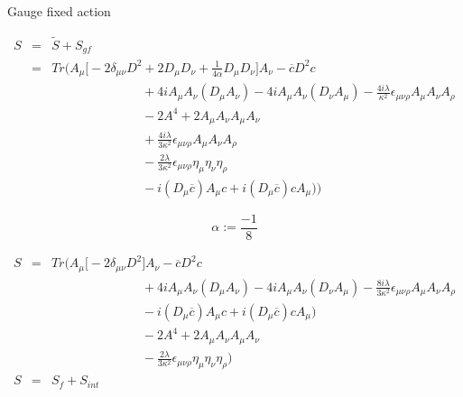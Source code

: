 \documentclass[10pt]{book}
\theoremstyle{break}
\begin{document}
Gauge fixed action

\begin{eqnarray*}
 S &=& \tilde{S} + S_{gf} \nonumber \\
 &=& Tr \Bigg( 
 A_\mu \bigg[ - 2 \delta_{\mu \nu} D^2 + 2 D_\mu D_\nu + \frac{1}{4 \alpha} D_\mu D_\nu \bigg] A_\nu - \overline{c} D^2 c \nonumber \\ 
 && \hspace{3cm} + 4i A_\mu A_\nu (D_\mu A_\nu) - 4i A_\mu A_\nu (D_\nu A_\mu) - \frac{4i\lambda}{\kappa^2} \epsilon_{\mu \nu \rho} A_\mu A_\nu A_\rho \nonumber \\
 && \hspace{3cm} - 2 A^4 + 2 A_\mu A_\nu A_\mu A_\nu \nonumber \\
 && \hspace{3cm} + \frac{4 i \lambda}{3 \kappa^2} \epsilon_{\mu \nu \rho} A_\mu A_\nu A_\rho \nonumber \\ 
 && \hspace{3cm} - \frac{2 \lambda}{3 \kappa^2} \epsilon_{\mu \nu \rho} \eta_{\mu} \eta_\nu \eta_\rho \nonumber \\
 && \hspace{3cm} - i ( D_\mu \overline{c} ) A_\mu c + i ( D_\mu \overline{c} ) c A_\mu \big) \Bigg) 
\end{eqnarray*}

\begin{equation*}
 \alpha := \frac{-1}{8}
\end{equation*}

\begin{eqnarray*}
 S &=& Tr \Bigg( 
 A_\mu \bigg[ - 2 \delta_{\mu \nu} D^2  \bigg] A_\nu - \overline{c} D^2 c \nonumber \\ 
 && \hspace{3cm} + 4i A_\mu A_\nu (D_\mu A_\nu) - 4i A_\mu A_\nu (D_\nu A_\mu) - \frac{8i\lambda}{3\kappa^2} \epsilon_{\mu \nu \rho} A_\mu A_\nu A_\rho \nonumber \\
 && \hspace{3cm} - i ( D_\mu \overline{c} ) A_\mu c + i ( D_\mu \overline{c} ) c A_\mu \big) \nonumber \\
 && \hspace{3cm} - 2 A^4 + 2 A_\mu A_\nu A_\mu A_\nu \nonumber \\ 
 && \hspace{3cm} - \frac{2 \lambda}{3 \kappa^2} \epsilon_{\mu \nu \rho} \eta_{\mu} \eta_\nu \eta_\rho \Bigg) \\
 S &=& S_{f} + S_{int}
\end{eqnarray*}
\end{document}
